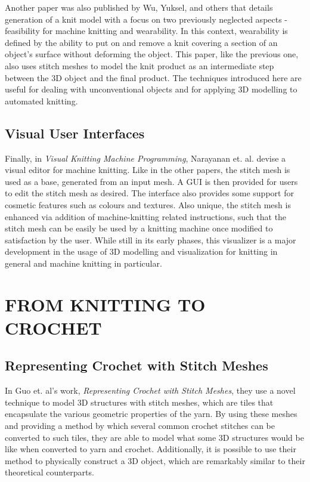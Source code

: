\documentclass{IEEEcsmag}
\begin{document}
Another paper was also published by Wu, Yuksel, and others that details
generation of a knit model with a focus on two previously neglected aspects -
feasibility for machine knitting and wearability. In this context, wearability
is defined by the ability to put on and remove a knit covering a section of an
object's surface without deforming the object. This paper, like the previous
one, also uses stitch meshes to model the knit product as an intermediate step
between the 3D object and the final product. The techniques introduced here are
useful for dealing with unconventional objects and for applying 3D modelling to
automated knitting.

\subsection{Visual User Interfaces}

Finally, in \textit{Visual Knitting Machine Programming}, Narayanan et. al.
devise a visual editor for machine knitting. Like in the other papers, the
stitch mesh is used as a base, generated from an input mesh. A GUI is then
provided for users to edit the stitch mesh as desired. The interface also
provides some support for cosmetic features such as colours and textures. Also
unique, the stitch mesh is enhanced via addition of machine-knitting related
instructions, such that the stitch mesh can be easily be used by a knitting
machine once modified to satisfaction by the user. While still in its early
phases, this visualizer is a major development in the usage of 3D modelling and
visualization for knitting in general and machine knitting in particular.

\section{FROM KNITTING TO CROCHET}

\subsection{Representing Crochet with Stitch Meshes}

In Guo et. al's work, \textit{Representing Crochet with Stitch Meshes}, they
use a novel technique to model 3D structures with stitch meshes, which are
tiles that encapsulate the various geometric properties of the yarn. By using
these meshes and providing a method by which several common crochet stitches
can be converted to such tiles, they are able to model what some 3D structures
would be like when converted to yarn and crochet. Additionally, it is possible
to use their method to physically construct a 3D object, which are remarkably
similar to their theoretical counterparts.
\end{document}
